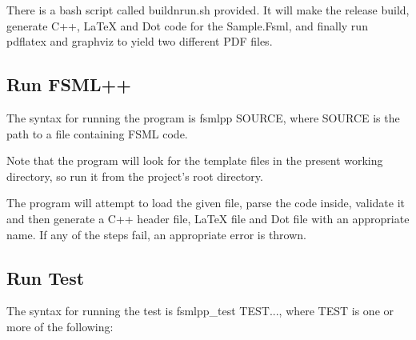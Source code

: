 There is a bash script called {\ttfamily buildnrun.\-sh} provided. It will make the release build, generate C++, La\-Te\-X and Dot code for the Sample.\-Fsml, and finally run {\ttfamily pdflatex} and {\ttfamily graphviz} to yield two different P\-D\-F files.

\subsection*{Run F\-S\-M\-L++}

The syntax for running the program is {\ttfamily fsmlpp S\-O\-U\-R\-C\-E}, where S\-O\-U\-R\-C\-E is the path to a file containing F\-S\-M\-L code.

Note that the program will look for the template files in the present working directory, so run it from the project's root directory.

The program will attempt to load the given file, parse the code inside, validate it and then generate a C++ header file, La\-Te\-X file and Dot file with an appropriate name. If any of the steps fail, an appropriate error is thrown.

\subsection*{Run Test}

The syntax for running the test is {\ttfamily fsmlpp\-\_\-test T\-E\-S\-T...}, where T\-E\-S\-T is one or more of the following\-:


